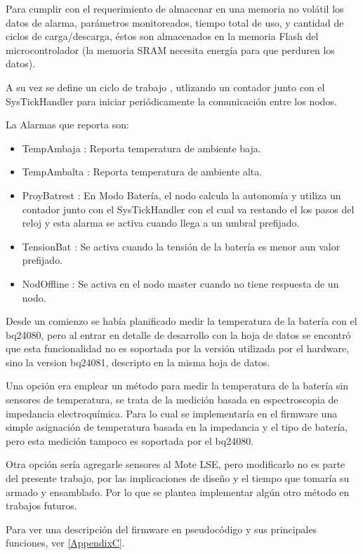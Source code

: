 {Para cumplir con el requerimiento de almacenar en una memoria no volátil los datos de alarma, parámetros monitoreados, tiempo total de uso, y cantidad de ciclos de carga/descarga, éstos son almacenados en la memoria Flash del microcontrolador (la memoria SRAM necesita energía para que perduren los datos). 

A su vez se define un ciclo de trabajo , utlizando un contador junto con el SysTickHandler para iniciar periódicamente la comunicación entre los nodos. 

\noindent La Alarmas que reporta son:
	\begin{itemize}
	\item TempAmbaja : Reporta temperatura de ambiente baja.
	\item TempAmbalta : Reporta temperatura de ambiente alta.
	\item ProyBatrest : En Modo Batería, el nodo calcula la autonomía y utiliza un contador junto con el SysTickHandler con el cual va restando el los pasos del reloj y esta alarma se activa cuando llega a un umbral prefijado.
	\item TensionBat : Se activa cuando la tensión de la batería es menor aun valor prefijado.
	\item NodOffline : Se activa en el nodo master cuando no tiene respuesta de un nodo.
	\end{itemize}

Desde un comienzo se había planificado medir la temperatura de la batería con el bq24080, pero al entrar en detalle de desarrollo con la hoja de datos se encontró que esta funcionalidad no es soportada por la versión utilizada por el hardware, sino la version bq24081, descripto en la misma hoja de datos.

Una opción era emplear un método para medir la temperatura de la batería sin sensores de temperatura, se trata de la medición basada en espectroscopia de impedancia electroquímica\citep{metodo}. Para lo cual se implementaría en el firmware una simple asignación de temperatura basada en la impedancia y el tipo de batería, pero esta medición tampoco es soportada por el bq24080.

Otra opción sería agregarle sensores al Mote LSE, pero modificarlo no es parte del presente trabajo, por las implicaciones de diseño y el tiempo que tomaría su armado y ensamblado. Por lo que se plantea implementar algún otro método en trabajos futuros.

Para ver una descripción del firmware en pseudocódigo y sus principales funciones, ver \ref{AppendixC}.

}
